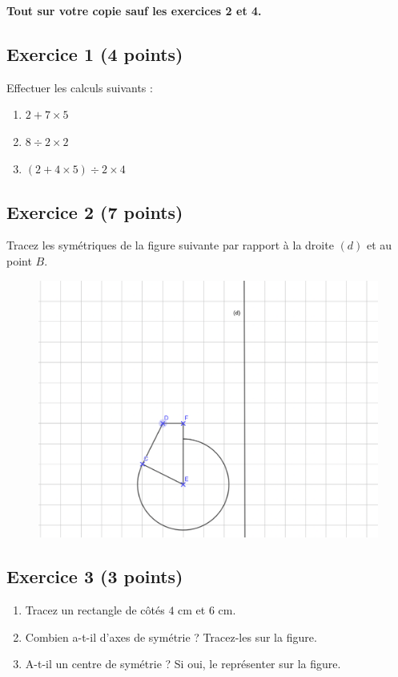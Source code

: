 \documentclass[14 pt]{extarticle}
\theoremstyle{plain}
\begin{document}
 \textbf{Tout sur votre copie sauf les exercices 2 et 4.}
 \subsection*{Exercice 1 (4 points)}
Effectuer les calculs suivants : 
\begin{enumerate}
\item $2+ 7 \times 5  $
\item $8\div 2 \times 2$ 
\item $ (2+ 4\times5) \div 2\times 4$
\end{enumerate}


 \subsection*{Exercice 2 (7 points)}
 
 Tracez les symétriques de la figure suivante par rapport à la droite $(d)$ et au point $B$. 
 
 \begin{figure}[H]
 \center
 \includegraphics[scale=.5]{Exo1b.png}
 \end{figure}
 
 \subsection*{Exercice 3 (3 points)}
 
 \begin{enumerate}
 \item Tracez un rectangle de côtés $4$ cm et $6$ cm. 
 \item Combien a-t-il d'axes de symétrie ? Tracez-les sur la figure.
 \item A-t-il un centre de symétrie ? Si oui, le représenter sur la
 figure. 
 \end{enumerate}
 
\end{document}
